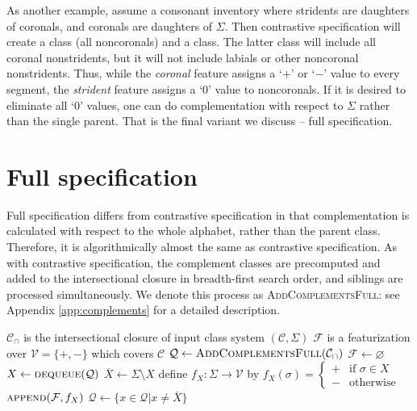 \documentclass[11pt, oneside]{article}   	%
\begin{document}
As another example, assume a consonant inventory where stridents are daughters of coronals, and coronals are daughters of $\Sigma$. Then contrastive specification will create a  class (all noncoronals) and a  class. The latter class will include all coronal nonstridents, but it will not include labials or other noncoronal nonstridents. Thus, while the \textit{coronal} feature assigns a `$+$' or `$-$' value to every segment, the \textit{strident} feature assigns a `$0$' value to noncoronals. If it is desired to eliminate all `$0$' values, one can do complementation with respect to $\Sigma$ rather than the single parent. That is the final variant we discuss -- full specification.

\FloatBarrier
\section{Full specification}
\label{sec:full}

Full specification differs from contrastive specification in that complementation is calculated with respect to the whole alphabet, rather than the parent class. Therefore, it is algorithmically almost the same as contrastive specification. As with contrastive specification, the complement classes are precomputed and added to the intersectional closure in breadth-first search order, and siblings are processed simultaneously. We denote this process as \textsc{AddComplementsFull}: see Appendix \ref{app:complements} for a detailed description.

\noindent \begin{algorithmic}
    \REQUIRE $\mathcal C_\cap$ is the intersectional closure of input class system $(\mathcal C, \Sigma)$
    \ENSURE $\mathcal F$ is a featurization over $\mathcal V = \{ +, - \}$ which covers $\mathcal C$
    \STATE
    \STATE $\mathcal Q \leftarrow \textsc{AddComplementsFull}(\mathcal{C_\cap})$
    \STATE $\mathcal F \leftarrow \varnothing$
    \STATE
        \STATE $X \leftarrow \textsc{dequeue}(\mathcal Q)$
	        \STATE $\overline{X} \leftarrow \Sigma \setminus X$
            \STATE define $f_X : \Sigma \rightarrow \mathcal V$ by $f_X (\sigma) = \begin{cases}
                    + & \text{if } \sigma \in X \\
                    - & \text{otherwise}
                    \end{cases}$
            \STATE $\textsc{append}(\mathcal F, f_X)$
            \STATE $\mathcal{Q} \leftarrow \{x \in \mathcal{Q} \vert x \neq \overline{X} \}$
        \ENDIF
    \ENDWHILE
\end{algorithmic}
\end{document}
